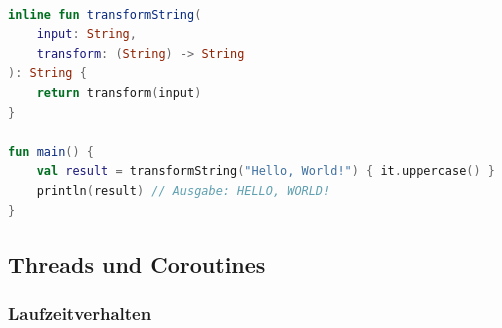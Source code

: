 \documentclass[11pt]{article}
\begin{document}
    \begin{lstlisting}[language=Kotlin, caption={InlineFunction.java}, label={lst:kotlin-inline-function}]

inline fun transformString(
    input: String,
    transform: (String) -> String
): String {
    return transform(input)
}

fun main() {
    val result = transformString("Hello, World!") { it.uppercase() }
    println(result) // Ausgabe: HELLO, WORLD!
}
    \end{lstlisting}

    \subsection{Threads und Coroutines}

    \subsubsection{Laufzeitverhalten}
\end{document}
